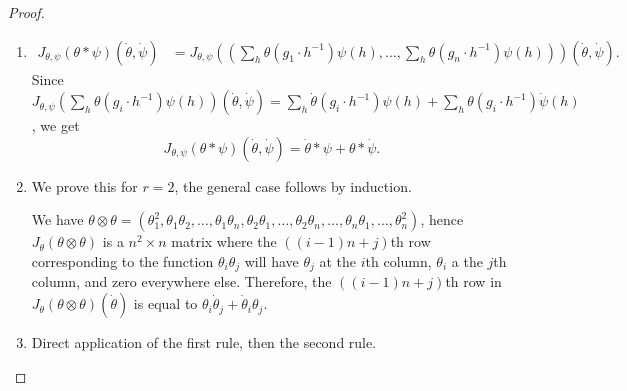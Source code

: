 \documentclass[final]{article}
\newcommand{\conv}{\ast}
\newcommand{\kprod}{\otimes}
\theoremstyle{definition}
\theoremstyle{plain}
\begin{document}
\begin{proof}
    \begin{enumerate}
        \item 
        \begin{align*}
            J_{\theta , \psi}(\theta \conv \psi)(\dot{\theta}, \dot{\psi}) &= J_{\theta , \psi}\left(\left(\sum_h \theta(g_1 \cdot h^{-1})\psi(h), \hdots, \sum_h \theta(g_n \cdot h^{-1})\psi(h)\right)\right)(\dot{\theta}, \dot{\psi}).
        \end{align*}
        Since $ J_{\theta , \psi}\left(\sum_h \theta(g_i \cdot h^{-1})\psi(h)\right)(\dot{\theta}, \dot{\psi}) = \sum_h \dot{\theta}(g_i \cdot h^{-1})\psi(h) + \sum_h \theta(g_i \cdot h^{-1})\dot{\psi}(h)$, we get
    \[
    J_{\theta , \psi}(\theta \conv \psi)(\dot{\theta}, \dot{\psi}) = \dot{\theta}\conv \psi + \theta\conv \dot{\psi}.
    \]

    \item We prove this for $r=2$, the general case follows by induction.

    We have $\theta \kprod \theta = (\theta_1^2, \theta_1\theta_2, \hdots , \theta_1\theta_n, \theta_2\theta_1, \hdots, \theta_2\theta_n, \hdots, \theta_n \theta_1, \hdots, \theta_n^2)$, hence $J_\theta(\theta \kprod \theta)$ is a $n^2 \times n$ matrix where the $((i-1)n + j)$th row corresponding to the function $\theta_i\theta_j$ will have $\theta_j$ at the $i$th column, $\theta_i$ a the $j$th column, and zero everywhere else.
    Therefore, the $((i-1)n + j)$th row in $J_\theta(\theta \kprod \theta)(\dot{\theta})$ is equal to $\theta_i\dot{\theta}_j + \dot{\theta}_i\theta_j$.

    \item Direct application of the first rule, then the second rule.
    \end{enumerate}
\end{proof}
\end{document}
